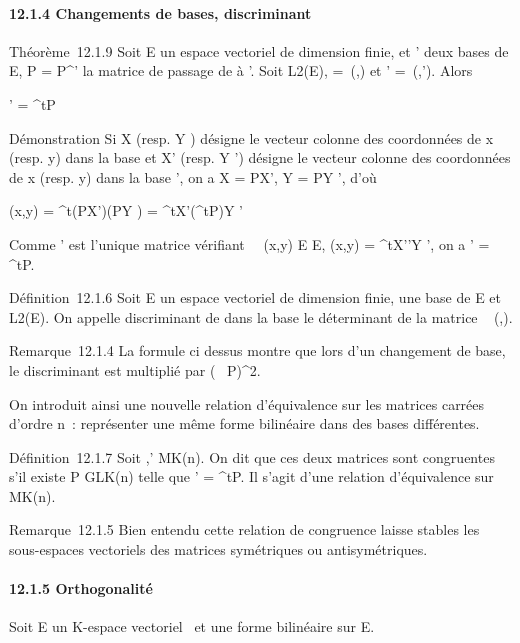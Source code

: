 \paragraph{12.1.4 Changements de bases, discriminant}

Théorème~12.1.9 Soit E un espace vectoriel de dimension finie,  et '
deux bases de E, P = P^' la matrice de passage de  à
'. Soit \phi \in L2(E), \Omega =\
\mathrmMat (\phi,) et \Omega' =\
\mathrmMat (\phi,'). Alors

\Omega' = ^tP\OmegaP

Démonstration Si X (resp. Y ) désigne le vecteur colonne des coordonnées
de x (resp. y) dans la base  et X' (resp. Y ') désigne le vecteur
colonne des coordonnées de x (resp. y) dans la base \mathcal{E}', on a X = PX', Y
= PY ', d'où

\phi(x,y) = ^t(PX')\Omega(PY ) = ^tX'(^tP\OmegaP)Y '

Comme \Omega' est l'unique matrice vérifiant \forall~~(x,y)
\in E \times E, \phi(x,y) = ^tX'\Omega'Y ', on a \Omega' = ^tP\OmegaP.

Définition~12.1.6 Soit E un espace vectoriel de dimension finie,  une
base de E et \phi \in L2(E). On appelle discriminant de \phi dans la
base \mathcal{E} le déterminant de la matrice
\mathrmMat~ (\phi,\mathcal{E}).

Remarque~12.1.4 La formule ci dessus montre que lors d'un changement de
base, le discriminant est multiplié par
(\mathrm{det}~
P)^2.

On introduit ainsi une nouvelle relation d'équivalence sur les matrices
carrées d'ordre n~: représenter une même forme bilinéaire dans des bases
différentes.

Définition~12.1.7 Soit \Omega,\Omega' \in MK(n). On dit que ces deux
matrices sont congruentes s'il existe P \in GLK(n) telle que \Omega'
= ^tP\OmegaP. Il s'agit d'une relation d'équivalence sur
MK(n).

Remarque~12.1.5 Bien entendu cette relation de congruence laisse stables
les sous-espaces vectoriels des matrices symétriques ou antisymétriques.

\paragraph{12.1.5 Orthogonalité}

Soit E un K-espace vectoriel ~et \phi une forme bilinéaire sur E.

